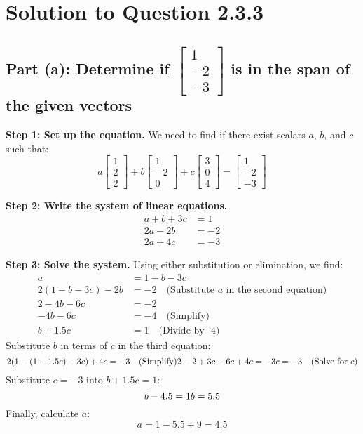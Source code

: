 \documentclass[12pt]{article}
\begin{document}
\section*{Solution to Question 2.3.3}

\subsection*{Part (a): Determine if \(\begin{bmatrix} 1 \\ -2 \\ -3 \end{bmatrix}\) is in the span of the given vectors}

\textbf{Step 1: Set up the equation.} We need to find if there exist scalars \(a\), \(b\), and \(c\) such that:
\[
a \begin{bmatrix} 1 \\ 2 \\ 2 \end{bmatrix} + b \begin{bmatrix} 1 \\ -2 \\ 0 \end{bmatrix} + c \begin{bmatrix} 3 \\ 0 \\ 4 \end{bmatrix} = \begin{bmatrix} 1 \\ -2 \\ -3 \end{bmatrix}
\]

\textbf{Step 2: Write the system of linear equations.}
\[
\begin{aligned}
a + b + 3c &= 1 \\
2a - 2b &= -2 \\
2a + 4c &= -3
\end{aligned}
\]

\textbf{Step 3: Solve the system.} Using either substitution or elimination, we find:
\[
\begin{aligned}
a &= 1 - b - 3c \\
2(1 - b - 3c) - 2b &= -2 \quad \text{(Substitute \(a\) in the second equation)} \\
2 - 4b - 6c &= -2 \\
-4b - 6c &= -4 \quad \text{(Simplify)} \\
b + 1.5c &= 1 \quad \text{(Divide by -4)}
\end{aligned}
\]
Substitute \(b\) in terms of \(c\) in the third equation:
\[
2(1 - (1 - 1.5c) - 3c) + 4c = -3 \quad \text{(Simplify)} \\
2 - 2 + 3c - 6c + 4c = -3 \\
c = -3 \quad \text{(Solve for \(c\))}
\]
Substitute \(c = -3\) into \(b + 1.5c = 1\):
\[
b - 4.5 = 1 \\
b = 5.5
\]
Finally, calculate \(a\):
\[
a = 1 - 5.5 + 9 = 4.5
\]
\end{document}
